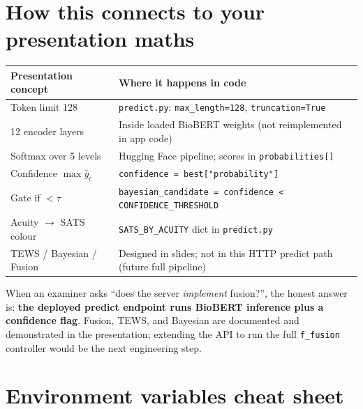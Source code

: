 \documentclass[11pt]{article}
\begin{document}
\section{How this connects to your presentation maths}

\begin{center}
\begin{tabular}{@{}p{}p{}@{}}
\toprule
\textbf{Presentation concept} & \textbf{Where it happens in code} \\
\midrule
Token limit 128 &
\texttt{predict.py}: \texttt{max\_length=128}, \texttt{truncation=True} \\[4pt]
12 encoder layers &
Inside loaded BioBERT weights (not reimplemented in app code) \\[4pt]
Softmax over 5 levels &
Hugging Face pipeline; scores in \texttt{probabilities[]} \\[4pt]
Confidence $\max \hat{y}_c$ &
\texttt{confidence = best["probability"]} \\[4pt]
Gate if $< \tau$ &
\texttt{bayesian\_candidate = confidence < CONFIDENCE\_THRESHOLD} \\[4pt]
Acuity $\to$ SATS colour &
\texttt{SATS\_BY\_ACUITY} dict in \texttt{predict.py} \\[4pt]
TEWS / Bayesian / Fusion &
Designed in slides; not in this HTTP predict path (future full pipeline) \\
\bottomrule
\end{tabular}
\end{center}

When an examiner asks ``does the server \emph{implement} fusion?'', the honest answer is:
\textbf{the deployed predict endpoint runs BioBERT inference plus a confidence flag}. Fusion,
TEWS, and Bayesian are documented and demonstrated in the presentation; extending the API to run
the full \texttt{f\_fusion} controller would be the next engineering step.

\section{Environment variables cheat sheet}
\end{document}
